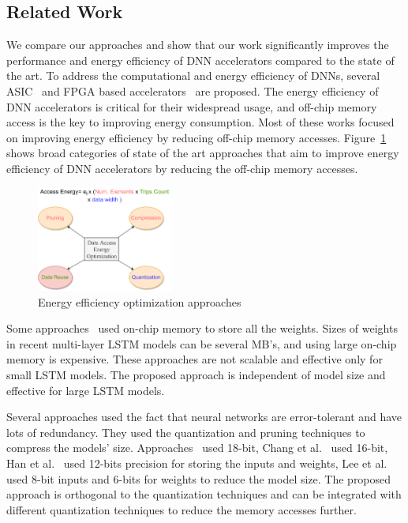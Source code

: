 \documentclass[a4paper,10pt]{article}
\begin{document}
\subsection{Related Work}
We compare our approaches and show that our work significantly improves the performance and energy efficiency of DNN accelerators compared to the state of the art. To address the computational and energy efficiency of DNNs, several ASIC~\cite{conti2018chipmunk,wang2017accelerating,azari2020elsa} and FPGA based accelerators~\cite{chang2015recurrent,ferreira2016fpga,lee2016fpga,guan2017fpga,han2017ese} are proposed. The energy efficiency of DNN accelerators is critical for their widespread usage, and off-chip memory access is the key to improving energy consumption. Most of these works focused on improving energy efficiency by reducing off-chip memory accesses. Figure~\ref{fig:dataEnergyRelatedWork} shows broad categories of state of the art approaches that aim to improve energy efficiency of DNN accelerators by reducing the off-chip memory accesses.
\begin{figure}[!htb]
	\centering
	\includegraphics[width=0.4\textwidth]{./images/dataEnergyOptRelatedWork}
	\caption{Energy efficiency optimization approaches}
	\label{fig:dataEnergyRelatedWork}
\end{figure}
Some approaches~\cite{lee2016fpga, rybalkin2018finn, ferreira2016fpga} used on-chip memory to store all the weights. Sizes of weights in recent multi-layer LSTM models can be several MB's, and using large on-chip memory is expensive. These approaches are not scalable and effective only for small LSTM models. The proposed approach is independent of model size and effective for large LSTM models.

Several approaches used the fact that neural networks are error-tolerant and have lots of redundancy. They used the quantization and pruning techniques to compress the models' size. Approaches~\cite{ferreira2016fpga,wang2018c} used 18-bit, Chang et al.~\cite{chang2015recurrent} used 16-bit, Han et al.~\cite{han2017ese} used 12-bits precision for storing the inputs and weights, Lee et al.~\cite{lee2016fpga} used 8-bit inputs and 6-bits for weights to reduce the model size. The proposed approach is orthogonal to the quantization techniques and can be integrated with different quantization techniques to reduce the memory accesses further. 
\end{document}
